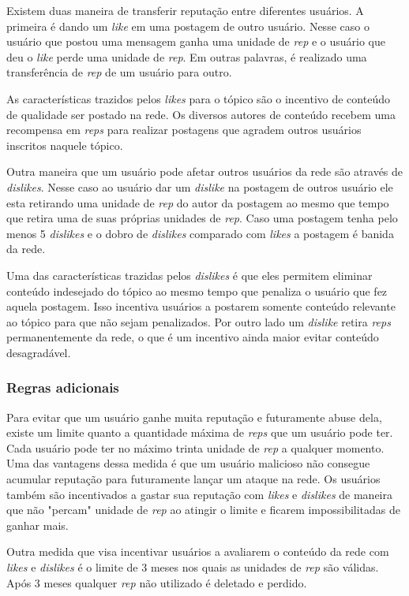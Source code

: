 \documentclass[12pt]{article}
\begin{document}
Existem duas maneira de transferir reputação entre diferentes usuários. A primeira é dando um \emph{like} em uma postagem de outro usuário. Nesse caso o usuário que postou uma mensagem ganha uma unidade de \emph{rep} e o usuário que deu o \emph{like} perde uma unidade de \emph{rep}. Em outras palavras, é realizado uma transferência de \emph{rep} de um usuário para outro. 

As características trazidos pelos \emph{likes} para o tópico são o incentivo de conteúdo de qualidade ser postado na rede. Os diversos autores de conteúdo recebem uma recompensa em \emph{reps} para realizar postagens que agradem outros usuários inscritos naquele tópico.

Outra maneira que um usuário pode afetar outros usuários da rede são através de \emph{dislikes}. Nesse caso ao usuário dar um \emph{dislike} na postagem de outros usuário ele esta retirando uma unidade de \emph{rep} do autor da postagem ao mesmo que tempo que retira uma de suas próprias unidades de \emph{rep}. Caso uma postagem tenha pelo menos 5 \emph{dislikes} e o dobro de \emph{dislikes} comparado com \emph{likes} a postagem é banida da rede.  

Uma das características trazidas pelos \emph{dislikes} é que eles permitem eliminar conteúdo indesejado do tópico ao mesmo tempo que penaliza o usuário que fez aquela postagem. Isso incentiva usuários a postarem somente conteúdo relevante ao tópico para que não sejam penalizados. Por outro lado um \emph{dislike} retira \emph{reps} permanentemente da rede, o que é um incentivo ainda maior evitar conteúdo desagradável.

\subsubsection{Regras adicionais} \label{subsubsec:+regras}

Para evitar que um usuário ganhe muita reputação e futuramente abuse dela, existe um limite quanto a quantidade máxima de \emph{reps} que um usuário pode ter. Cada usuário pode ter no máximo trinta unidade de \emph{rep} a qualquer momento. Uma das vantagens dessa medida é que um usuário malicioso não consegue acumular reputação para futuramente lançar um ataque na rede. Os usuários também são incentivados a gastar sua reputação com \emph{likes} e \emph{dislikes} de maneira que não "percam" unidade de \emph{rep} ao atingir o limite e ficarem impossibilitadas de ganhar mais.

Outra medida que visa incentivar usuários a avaliarem o conteúdo da rede com \emph{likes} e \emph{dislikes} é o limite de 3 meses nos quais as unidades de \emph{rep} são válidas. Após 3 meses qualquer \emph{rep} não utilizado é deletado e perdido. 
\end{document}
